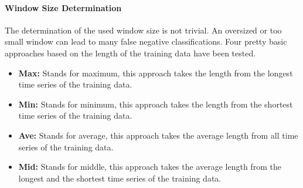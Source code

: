 \paragraph{Window Size Determination} \label{window_size_determination}
The determination of the used window size is not trivial. An oversized or too small window can lead to many false
negative classifications. Four pretty basic approaches based on the length of the training data have been tested.

\begin{itemize}
    \item \textbf{Max:} Stands for maximum, this approach takes the length from the longest time series of the training
        data.
    \item \textbf{Min:} Stands for minimum, this approach takes the length from the shortest time series of the training
        data.
    \item \textbf{Ave:} Stands for average, this approach takes the average length from all time series of the training
        data.
    \item \textbf{Mid:} Stands for middle, this approach takes the average length from the longest and the shortest time
        series of the training data.
\end{itemize}
